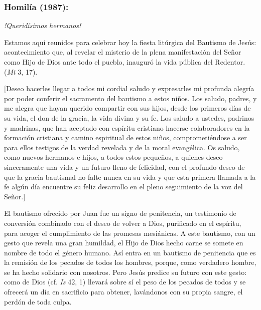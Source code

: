 			\subsubsection{Homilía (1987):}
				
				\begin{body}
					\emph{!Queridísimos hermanos!}
					
					Estamos aquí reunidos para celebrar hoy la fiesta litúrgica del Bautismo de Jesús: acontecimiento que, al revelar el misterio de la plena manifestación del Señor como Hijo de Dios ante todo el pueblo, inauguró la vida pública del Redentor.  (\emph{Mt} 3, 17).
					
					{[}Deseo hacerles llegar a todos mi cordial saludo y expresarles mi profunda alegría por poder conferir el sacramento del bautismo a estos niños. Los saludo, padres, y me alegra que hayan querido compartir con sus hijos, desde los primeros días de su vida, el don de la gracia, la vida divina y su fe. Los saludo a ustedes, padrinos y madrinas, que han aceptado con espíritu cristiano hacerse colaboradores en la formación cristiana y camino espiritual de estos niños, comprometiéndose a ser para ellos testigos de la verdad revelada y de la moral evangélica. Os saludo, como nuevos hermanos e hijos, a todos estos pequeños, a quienes deseo sinceramente una vida y un futuro lleno de felicidad, con el profundo deseo de que la gracia bautismal no falte nunca en su vida y que esta primera llamada a la fe algún día encuentre su feliz desarrollo en el pleno seguimiento de la voz del Señor.{]}
					
					El bautismo ofrecido por Juan fue un signo de penitencia, un testimonio de conversión combinado con el deseo de volver a Dios, purificado en el espíritu, para acoger el cumplimiento de las promesas mesiánicas. A este bautismo, con un gesto que revela una gran humildad, el Hijo de Dios hecho carne se somete en nombre de todo el género humano. Así entra en un bautismo de penitencia que es la remisión de los pecados de todos los hombres, porque, como verdadero hombre, se ha hecho solidario con nosotros. Pero Jesús predice su futuro con este gesto: como  de Dios (cf. \emph{Is} 42, 1) llevará sobre sí el peso de los pecados de todos y se ofrecerá un día en sacrificio para obtener, lavándonos con su propia sangre, el perdón de toda culpa.
					

\end{body}
